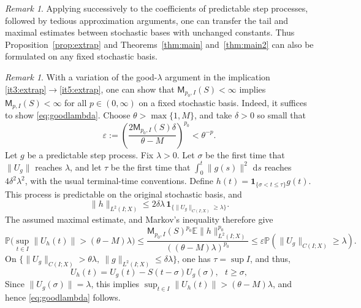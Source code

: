 \documentclass[11pt]{amsart}
\theoremstyle{definition}
\theoremstyle{remark}
\newtheorem{remark}[theorem]{Remark}
\numberwithin{equation}{section}
\newcommand{\E}{\mathbb E}
\renewcommand{\P}{\mathbb P}
\newcommand{\1}{\mathbf 1}
\newcommand{\cM}{\mathsf{M}}
\newcommand{\norm}[1]{\lVert #1\rVert}
\newcommand{\dd}{\,\mathrm d}
\newcommand{\one}{\1}
\begin{document}
\begin{remark}\label{rem:fixed-basis}
Applying \cite[Lemma~1.3(b)]{Kurtz2014} successively to the coefficients of predictable step processes, followed by tedious approximation arguments, one can transfer the tail and maximal estimates between stochastic bases with unchanged constants. Thus Proposition~\ref{prop:extrap} and Theorems~\ref{thm:main} and~\ref{thm:main2} can also be formulated on any fixed stochastic basis.  \end{remark}

\begin{remark}\label{rem:extrapolationMp}
With a variation of the good-$\lambda$ argument in the implication \ref{it3:extrap}$\to$\ref{it5:extrap}, one can show that $\cM_{p_0,I}(S)<\infty$ implies $\cM_{p,I}(S)<\infty$ for all $p\in (0,\infty)$ on a fixed stochastic basis. Indeed, it suffices to show \eqref{eq:goodlambda}. 
Choose $\theta>\max\{1,M\}$, and take $\delta>0$ so small that
\[
    \varepsilon :=\left(\frac{2\cM_{p_0,I}(S) \delta}{\theta-M}\right)^{p_0}
    <\theta^{-p}.
\]
Let $g$ be a predictable step process. Fix $\lambda>0$. Let $\sigma$ be the first time that $\norm{U_g}$
reaches $\lambda$, and let $\tau$ be the first time that
$\int_0^t\norm{g(s)}^2\,\dd s$ reaches $4\delta^2\lambda^2$,
with the usual terminal-time conventions. Define $h(t)=\one_{\{\sigma<t\leq\tau\}}g(t)$. This process is predictable on the original stochastic basis, and
\[
    \norm{h}_{L^2(I;X)}
    \leq 2\delta\lambda\,\one_{\{\norm{U_g}_{C(I;X)}\geq\lambda\}}.
\]
The assumed maximal estimate, and Markov's inequality therefore give
\[
    \P\Big(\sup_{t\in I}\norm{U_h(t)}
        >(\theta-M)\lambda\Big)
    \leq
    \frac{\cM_{p_0,I}(S)^{p_0}\E\norm{h}_{L^2(I;X)}^{p_0}}
         {((\theta-M)\lambda)^{p_0}} \leq \varepsilon \P(\norm{U_g}_{C(I;X)}\geq\lambda).
\]
On $\{\norm{U_g}_{C(I;X)}>\theta\lambda,\ \norm{g}_{L^2(I;X)}\leq\delta\lambda\}$, one has $\tau = \sup I$, and thus, 
\[
    U_h(t)=U_g(t)-S(t-\sigma)U_g(\sigma), \ \ \  t\geq\sigma, 
\]
Since $\norm{U_g(\sigma)}=\lambda$, this implies $\sup_{t\in I}\norm{U_h(t)}>(\theta-M)\lambda$, and hence \eqref{eq:goodlambda} follows.
\end{remark}
\end{document}
